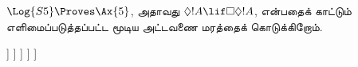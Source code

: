 \documentclass[../../../include/open-logic-section]{subfiles}
\begin{document}
\begin{ex}
  $\Log{S5} \Proves \Ax{5}$, அதாவது $\Diamond!A \lif
  \Box\Diamond!A$, என்பதைக் காட்டும் எளிமைப்படுத்தப்பட்ட மூடிய அட்டவணை
  மரத்தைக் கொடுக்கிறோம்.
  \begin{oltableau}
    [\pFmla{\False}{\Diamond\formula{A} \lif \Box\Diamond \formula{A}}{1},
      just = \TAss
      [\pFmla{\True}{\Diamond \formula{A}}{1}, just = {\TRule{\False}{\lif}[1]}
        [\pFmla{\False}{\Box\Diamond \formula{A}}{1},
          just = {\TRule{\False}{\lif}[1]}
          [\pFmla{\False}{\Diamond \formula{A}}{2},
            just = {\TRule{\False}{\Box}[3]}
            [\pFmla{\True}{\formula{A}}{3},
              just = {\TRule{\True}{\Diamond}[2]}
                [\pFmla{\False}{\formula{A}}{3},
                  just = {\TRule{\False}{\Diamond}[4]}, close]
            ]
          ]
        ]
      ]
    ]
  \end{oltableau}
\end{ex}
\end{document}
